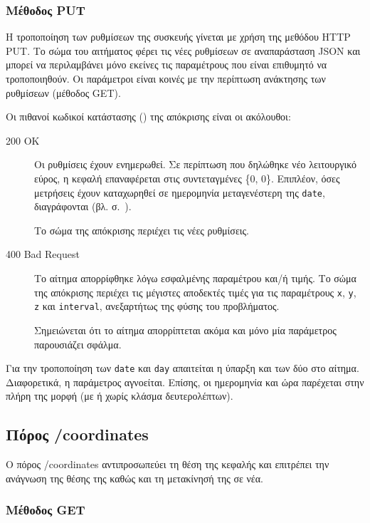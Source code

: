 \subsubsection{Μέθοδος PUT}

Η τροποποίηση των ρυθμίσεων της συσκευής γίνεται με χρήση της μεθόδου HTTP PUT.
Το σώμα του αιτήματος φέρει τις νέες ρυθμίσεων σε αναπαράσταση JSON και μπορεί
να περιλαμβάνει μόνο εκείνες τις παραμέτρους που είναι επιθυμητό να
τροποποιηθούν. Οι παράμετροι είναι κοινές με την περίπτωση ανάκτησης των
ρυθμίσεων (μέθοδος GET).

Οι πιθανοί κωδικοί κατάστασης () της απόκρισης είναι οι
ακόλουθοι:
\begin{description}
    \item[200 OK] Οι ρυθμίσεις έχουν ενημερωθεί. Σε περίπτωση που δηλώθηκε νέο
    λειτουργικό εύρος, η κεφαλή επαναφέρεται στις συντεταγμένες \{0, 0\}.
    Επιπλέον, όσες μετρήσεις έχουν καταχωρηθεί σε ημερομηνία μεταγενέστερη της
    \verb~date~, διαγράφονται (βλ. 
    σ.~\pageref{ssubsec:log:linear}).

    Το σώμα της απόκρισης περιέχει τις νέες ρυθμίσεις.

    \item[400 Bad Request] Το αίτημα απορρίφθηκε λόγω εσφαλμένης παραμέτρου
    και\slash{}ή τιμής. Το σώμα της απόκρισης περιέχει τις μέγιστες αποδεκτές
    τιμές για τις παραμέτρους \verb~x~, \verb~y~, \verb~z~ και \verb~interval~,
    ανεξαρτήτως της φύσης του προβλήματος.

    Σημειώνεται ότι το αίτημα απορρίπτεται ακόμα και μόνο μία παράμετρος
    παρουσιάζει σφάλμα.
\end{description}

Για την τροποποίηση των \verb~date~ και \verb~day~ απαιτείται η ύπαρξη και των
δύο στο αίτημα. Διαφορετικά, η παράμετρος αγνοείται. Επίσης, οι ημερομηνία και
ώρα παρέχεται στην πλήρη της μορφή (με ή χωρίς κλάσμα δευτερολέπτων).


\subsection{Πόρος /coordinates}
\label{subsec:network:coordinates}

Ο πόρος /coordinates αντιπροσωπεύει τη θέση της κεφαλής και επιτρέπει την
ανάγνωση της θέσης της καθώς και τη μετακίνησή της σε νέα.


\subsubsection{Μέθοδος GET}

